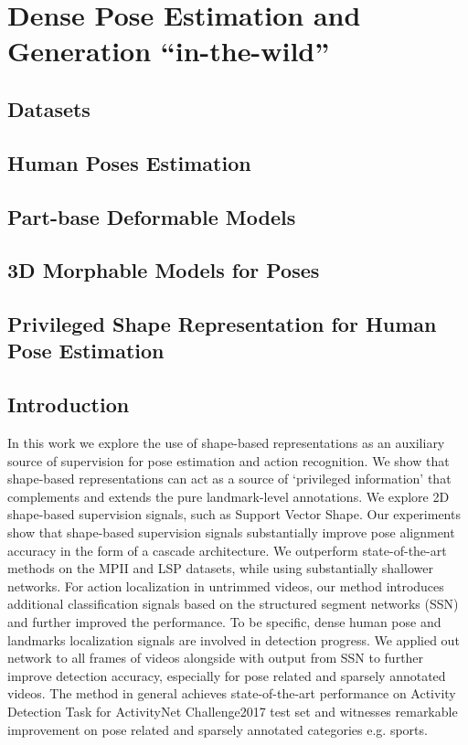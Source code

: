 \chapter{Dense Pose Estimation and Generation ``in-the-wild''}
\minitoc

\section{Datasets}

\section{Human Poses Estimation}

\section{Part-base Deformable Models}

\section{3D Morphable Models for Poses}

\section{Privileged Shape Representation for Human Pose Estimation}

\section{Introduction}

In this work we explore the use of shape-based representations as an auxiliary source of supervision for pose estimation and action recognition. We show that shape-based representations  can act as a source of `privileged information' that complements and extends the pure landmark-level annotations. We explore 2D shape-based supervision signals, such as Support Vector Shape. Our experiments show that shape-based supervision signals substantially improve pose alignment accuracy in the form of a cascade architecture. We outperform state-of-the-art methods on the MPII and LSP datasets, while using substantially shallower networks. For action localization in untrimmed videos, our method introduces additional classification signals based on the structured segment networks (SSN) and further improved the performance. To be specific, dense human pose and landmarks localization signals are involved in detection progress. We applied out network to all frames of videos alongside with output from SSN to further improve detection accuracy, especially for pose related and sparsely annotated videos. The method in general achieves state-of-the-art performance on Activity Detection Task for ActivityNet Challenge2017 test set and witnesses remarkable improvement on pose related and sparsely annotated categories e.g. sports.

